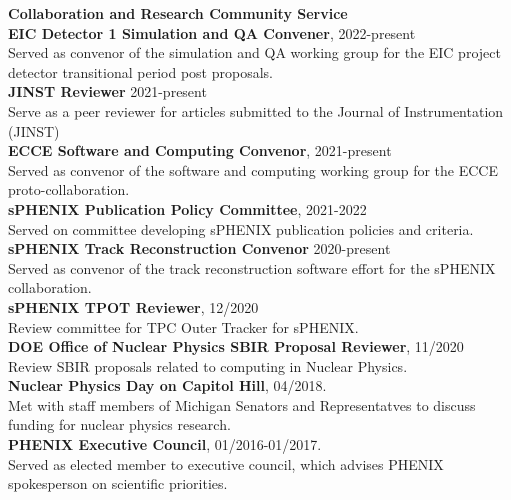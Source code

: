 \documentclass[11pt]{article}
\begin{document}
\begin{flushleft}
	\LARGE\textbf{Collaboration and Research Community Service} \\
	\normalsize 
	\vspace*{0.3cm}
	\textbf{EIC Detector 1 Simulation and QA Convener}, 2022-present \\ Served as convenor of the simulation and QA working group for the EIC project detector transitional period post proposals.\\
	\vspace*{0.3cm}
	\textbf{JINST Reviewer} 2021-present \\ Serve as a peer reviewer for articles submitted to the Journal of Instrumentation (JINST) \\
	\vspace{0.3cm}
	\textbf{ECCE Software and Computing Convenor}, 2021-present \\ Served as convenor of the software and computing working group for the ECCE proto-collaboration.\\
	\vspace*{0.2cm}
	\textbf{sPHENIX Publication Policy Committee}, 2021-2022 \\ Served on committee developing sPHENIX publication policies and criteria. \\
	\vspace*{0.2cm}
	\textbf{sPHENIX Track Reconstruction Convenor} 2020-present \\ Served as convenor of the track reconstruction software effort for the sPHENIX collaboration. \\
	\vspace*{0.2cm}
	\textbf{sPHENIX TPOT Reviewer}, 12/2020 \\ Review committee for TPC Outer Tracker for sPHENIX. \\

	\vspace*{0.2cm}
	\textbf{DOE Office of Nuclear Physics SBIR Proposal Reviewer}, 11/2020 \\ Review SBIR proposals related to computing in Nuclear Physics. \\
	\vspace*{0.2cm}
	\textbf{Nuclear Physics Day on Capitol Hill}, 04/2018. \\ Met with staff members of Michigan Senators and Representatves to discuss funding for nuclear physics research.\\
	\vspace*{0.2cm}
	\textbf{PHENIX Executive Council}, 01/2016-01/2017.\\ Served as elected member to executive council, which advises PHENIX spokesperson on scientific priorities.
	
	
\end{flushleft}
\end{document}
